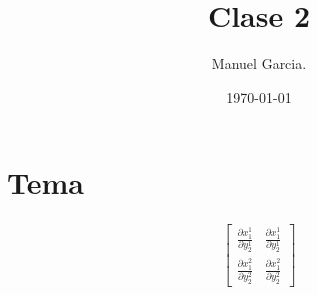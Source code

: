 \documentclass{article}
\title{Clase 2 }
\author{Manuel Garcia.}
\date{\today}
\begin{document}
\maketitle

\section{Tema}
\begin{gather}
   \begin{bmatrix}
       \frac{\partial x_{1}^1}{\partial y_{2}^1} & \frac{\partial x_{1}^1}{\partial y_{2}^1} \\
       \frac{\partial x_{1}^2}{\partial y_{2}^2} & \frac{\partial x_{1}^2}{\partial y_{2}^2}
   \end{bmatrix} 
  \label{eq:null}
\end{gather}
\end{document}
